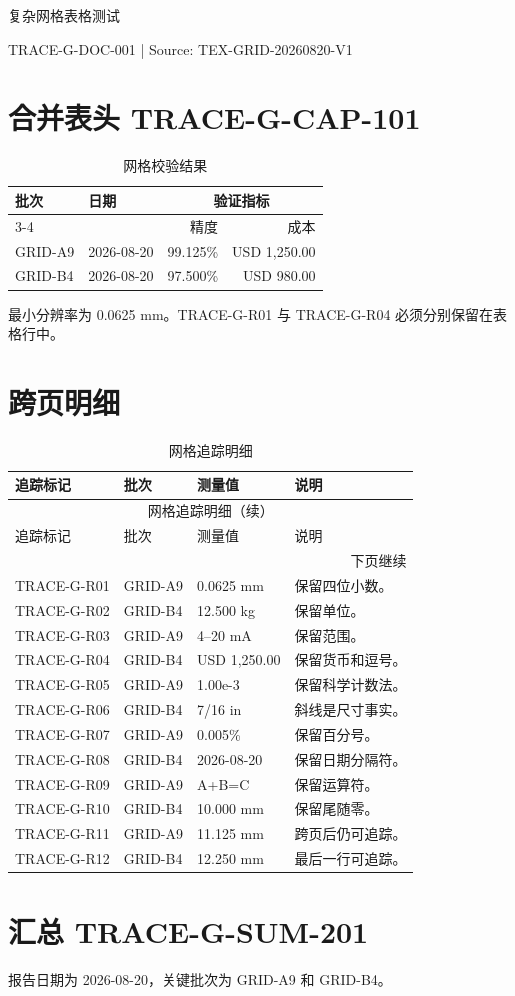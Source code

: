 \documentclass[10pt,a4paper]{ctexart}
\begin{document}
\begin{center}
{\LARGE 复杂网格表格测试}\par
{\small TRACE-G-DOC-001 | Source: TEX-GRID-20260820-V1}
\end{center}

\section{合并表头 TRACE-G-CAP-101}
\begin{table}[h]
\centering
\caption{网格校验结果}
\begin{tabular}{llrr}
\toprule
\multirow{2}{*}{批次} & \multirow{2}{*}{日期} & \multicolumn{2}{c}{验证指标}\\
\cmidrule(lr){3-4}
 & & 精度 & 成本\\
\midrule
GRID-A9 & 2026-08-20 & 99.125\% & USD 1,250.00\\
GRID-B4 & 2026-08-20 & 97.500\% & USD 980.00\\
\bottomrule
\end{tabular}
\end{table}

最小分辨率为 0.0625 mm。TRACE-G-R01 与 TRACE-G-R04 必须分别保留在表格行中。

\section{跨页明细}
\begin{longtable}{p{28mm}p{25mm}p{30mm}p{58mm}}
\caption{网格追踪明细}\\
\toprule
追踪标记 & 批次 & 测量值 & 说明\\
\midrule
\endfirsthead
\multicolumn{4}{c}{网格追踪明细（续）}\\
\toprule
追踪标记 & 批次 & 测量值 & 说明\\
\midrule
\endhead
\midrule
\multicolumn{4}{r}{下页继续}\\
\endfoot
\bottomrule
\endlastfoot
TRACE-G-R01 & GRID-A9 & 0.0625 mm & 保留四位小数。\\
TRACE-G-R02 & GRID-B4 & 12.500 kg & 保留单位。\\
TRACE-G-R03 & GRID-A9 & 4--20 mA & 保留范围。\\
TRACE-G-R04 & GRID-B4 & USD 1,250.00 & 保留货币和逗号。\\
TRACE-G-R05 & GRID-A9 & 1.00e-3 & 保留科学计数法。\\
TRACE-G-R06 & GRID-B4 & 7/16 in & 斜线是尺寸事实。\\
TRACE-G-R07 & GRID-A9 & 0.005\% & 保留百分号。\\
TRACE-G-R08 & GRID-B4 & 2026-08-20 & 保留日期分隔符。\\
TRACE-G-R09 & GRID-A9 & A+B=C & 保留运算符。\\
TRACE-G-R10 & GRID-B4 & 10.000 mm & 保留尾随零。\\
TRACE-G-R11 & GRID-A9 & 11.125 mm & 跨页后仍可追踪。\\
TRACE-G-R12 & GRID-B4 & 12.250 mm & 最后一行可追踪。\\
\end{longtable}

\section{汇总 TRACE-G-SUM-201}
报告日期为 2026-08-20，关键批次为 GRID-A9 和 GRID-B4。
\end{document}
